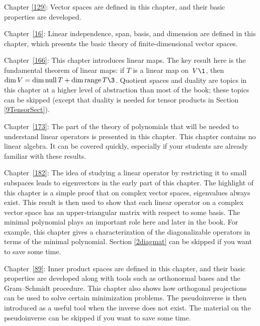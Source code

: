 \begin{Itemize}
\item
Chapter \ref{129}: Vector spaces are defined in this chapter, and their basic properties are developed.

\item
Chapter~\ref{16}: Linear independence, span, basis, and dimension are defined in
this chapter, which presents the basic theory of finite-dimensional
vector spaces.

\item
Chapter~\ref{166}: This chapter introduces linear maps.  The key result
here is the fundamental theorem of linear maps: if $T$ is a linear map on~$V\1$, then
$\dim V = \dim \ker T + \dim \ran T\3$. Quotient spaces and duality are topics in this chapter at a higher level of abstraction than most of the book; these topics can be skipped (except that duality is needed for tensor products in Section \ref{9TensorSect}).

\item
Chapter~\ref{173}: The part of the theory of polynomials that will be needed to understand linear
operators is presented in this chapter. This chapter contains no linear algebra. It can be covered quickly, especially if your students are already familiar with these results.

\item
Chapter~\ref{182}: The idea of studying a linear operator by restricting it to small subspaces
leads to eigenvectors in the early part of this chapter.  The highlight of this chapter is a
simple  proof that on complex vector spaces, eigenvalues always exist.
This result is then used to show that each linear operator on a
complex vector space has an upper-triangular matrix with respect to
some basis. The minimal polynomial plays an important role here and later in the book. For example, this chapter gives a characterization of the diagonalizable operators in terms of the minimal polynomial.
Section \ref{2diagmat} can be skipped if you want to save some time.

\item
Chapter~\ref{89}: Inner product spaces are defined in this chapter, and their basic
properties are developed along with tools such as orthonormal bases and the Gram--Schmidt procedure. This chapter also shows
how orthogonal projections can be used to solve certain minimization problems. The pseudoinverse is then introduced as a useful tool when the inverse does not exist. The material on the pseudoinverse can be skipped if you want to save some time.


\end{Itemize}
